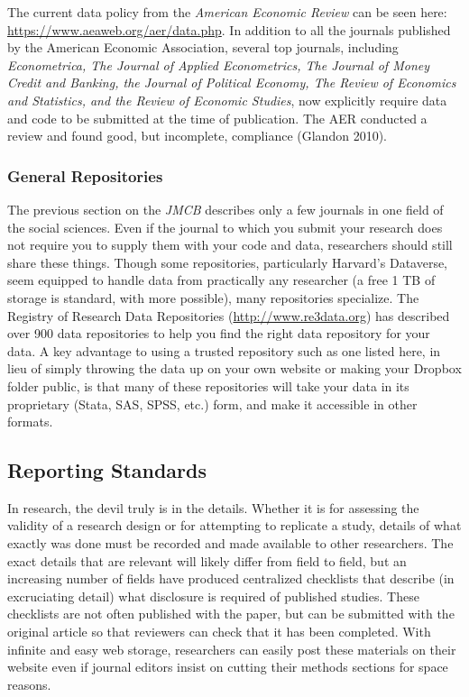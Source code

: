 \documentclass[12pt] {article}
\begin{document}
The current data policy from the \emph{American Economic Review} can be
seen here: \url{https://www.aeaweb.org/aer/data.php}. In addition to all
the journals published by the American Economic Association, several top
journals, including \emph{Econometrica, The Journal of Applied
Econometrics, The Journal of Money Credit and Banking, the Journal of
Political Economy, The Review of Economics and Statistics, and the
Review of Economic Studies}, now explicitly require data and code to be
submitted at the time of publication. The AER conducted a review and
found good, but incomplete, compliance (Glandon 2010).

\subsubsection{General Repositories}\label{general-repositories}

The previous section on the \emph{JMCB} describes only a few journals in
one field of the social sciences. Even if the journal to which you
submit your research does not require you to supply them with your code
and data, researchers should still share these things. Though some
repositories, particularly Harvard's Dataverse, seem equipped to handle
data from practically any researcher (a free 1 TB of storage is
standard, with more possible), many repositories specialize. The
Registry of Research Data Repositories (\url{http://www.re3data.org})
has described over 900 data repositories to help you find the right data
repository for your data. A key advantage to using a trusted repository
such as one listed here, in lieu of simply throwing the data up on your
own website or making your Dropbox folder public, is that many of these
repositories will take your data in its proprietary (Stata, SAS, SPSS,
etc.) form, and make it accessible in other formats.

\subsection{Reporting Standards}\label{reporting-standards}
In research, the devil truly is in the details. Whether it is for assessing the validity of a research design or for
attempting to replicate a study, details of what exactly was done must be recorded and made available to other researchers.
The exact details that are relevant will likely differ from field to field, but an increasing number of fields have
produced centralized checklists that describe (in excruciating detail) what disclosure is required of published studies. These checklists are not often published with the paper, but can be submitted with the original article so that reviewers can check that it has been completed. With infinite and easy web storage, researchers can easily post these materials on their website even if journal editors insist on cutting their methods sections for space reasons. 
\end{document}

